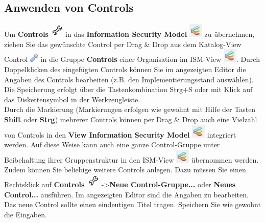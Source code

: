 \documentclass[a4paper,10pt]{book}
\begin{document}
\subsection{Anwenden von Controls}
Um \textbf{Controls} \includegraphics[height=2ex]{Icon/Controls.png} in das \textbf{Information Security Model} \includegraphics[height=2ex]{Icon/Informationssicherheitsmodell.png} zu übernehmen,
ziehen Sie das gewünschte Control per Drag \& Drop aus dem Katalog-View Control \includegraphics[height=2ex]{Icon/Control_Kataloge.png} in die Gruppe
\textbf{Controls} einer Organisation im ISM-View \includegraphics[height=2ex]{Icon/Informationssicherheitsmodell.png}. Durch Doppelklicken des eingefügten
Controls können Sie im angezeigten Editor die Angaben des Controls bearbeiten (z.B. den Implementierungsstand auswählen).
Die Speicherung erfolgt über die Tastenkombination Strg+S oder mit Klick auf das Diskettensymbol in der Werkzeugleiste.
\newline\\
Durch die Markierung (Markierungen erfolgen wie gewohnt mit Hilfe der Tasten \textbf{Shift} oder \textbf{Strg}) mehrerer Controls können
per Drag \& Drop auch eine Vielzahl von Controls in den \textbf{View Information Security Model} \includegraphics[height=2ex]{Icon/Informationssicherheitsmodell.png} integriert werden.
Auf diese Weise kann auch eine ganze Control-Gruppe unter Beibehaltung ihrer Gruppenstruktur
in den ISM-View \includegraphics[height=2ex]{Icon/Informationssicherheitsmodell.png} übernommen werden.
\newline\\
Zudem können Sie beliebige weitere Controls anlegen. Dazu müssen Sie einen Rechtsklick auf
\textbf{Controls} \includegraphics[height=2ex]{Icon/Controls.png} -\textgreater \textbf{Neue Control-Gruppe...} oder \textbf{Neues Control...} ausführen. Im angezeigten Editor sind die Angaben zu bearbeiten.
Das neue Control sollte einen eindeutigen Titel tragen. Speichern Sie wie gewohnt die Eingaben.
\end{document}
